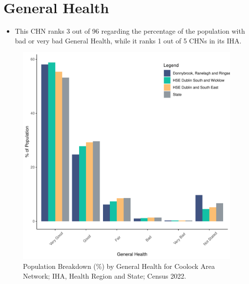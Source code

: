 \documentclass{article}
\begin{document}
\pagebreak

\section{General Health}\label{sect:GenHealth}
\begin{itemize}
\item  This CHN ranks  3 out of 96 regarding the percentage of the population with bad or very bad General Health, while it ranks   1 out of 5 CHNs in its IHA.
\end{itemize}
\begin{figure}[h]
	\centering
	\includegraphics[width = 150mm]{../figures/GenED.pdf}
	\caption{Population Breakdown (\%) by General Health for Coolock Area Network; IHA, Health Region and State;  Census 2022.}
	\label{fig:2ae19629-1a6a-13a3-e055-000000000001}
	\end{figure}
\end{document}
